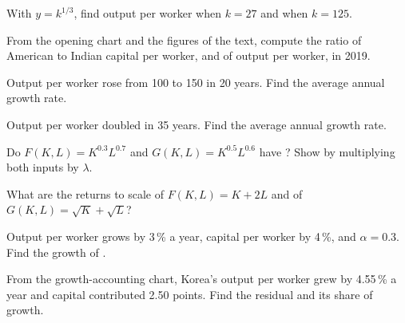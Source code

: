 \begin{exercise}[$\star$]\label{exo:g12:growth-and-production-function:2}
With $y = k^{1/3}$, find output per worker when $k = 27$ and when $k = 125$.
\end{exercise}

\begin{exercise}[$\star$]\label{exo:g12:growth-and-production-function:3}
From the opening chart and the figures of the text, compute the ratio of American to Indian capital per worker, and of output per worker, in 2019.
\end{exercise}

\begin{exercise}[$\star$]\label{exo:g12:growth-and-production-function:4}
Output per worker rose from 100 to 150 in 20 years. Find the average annual growth rate.
\end{exercise}

\begin{exercise}[$\star$]\label{exo:g12:growth-and-production-function:5}
Output per worker doubled in 35 years. Find the average annual growth rate.
\end{exercise}

\begin{exercise}[$\star\star$]\label{exo:g12:growth-and-production-function:6}
Do $F(K, L) = K^{0.3}L^{0.7}$ and $G(K, L) = K^{0.5}L^{0.6}$ have ? Show by multiplying both inputs by $\lambda$.
\end{exercise}

\begin{exercise}[$\star\star$]\label{exo:g12:growth-and-production-function:7}
What are the returns to scale of $F(K, L) = K + 2L$ and of $G(K, L) = \sqrt{K} + \sqrt{L}$?
\end{exercise}

\begin{exercise}[$\star\star$]\label{exo:g12:growth-and-production-function:8}
Output per worker grows by 3\,\% a year, capital per worker by 4\,\%, and $\alpha = 0.3$. Find the growth of .
\end{exercise}

\begin{exercise}[$\star\star$]\label{exo:g12:growth-and-production-function:9}
From the growth-accounting chart, Korea's output per worker grew by 4.55\,\% a year and capital contributed 2.50 points. Find the residual and its share of growth.
\end{exercise}

